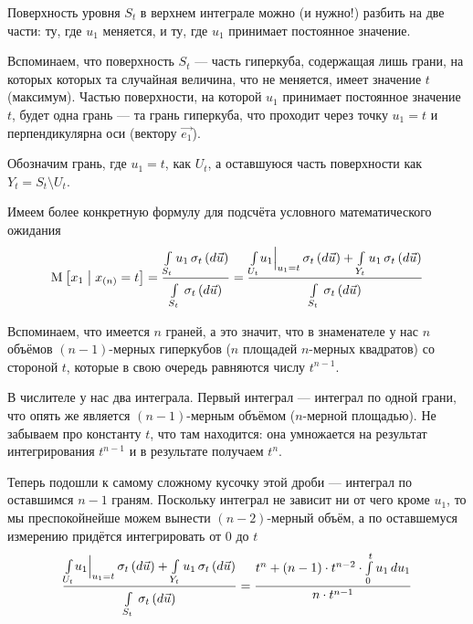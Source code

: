 Поверхность уровня $S_t$ в верхнем интеграле можно (и нужно!)
разбить на две части: ту, где $u_1$ меняется, и ту, где $u_1$
принимает постоянное значение.

Вспоминаем, что поверхность $S_t$ --- часть гиперкуба,
содержащая лишь грани, на которых которых та случайная величина,
что не меняется, имеет значение $t$ (максимум).
Частью поверхности, на которой $u_1$ принимает постоянное значение $t$,
будет одна грань --- та грань гиперкуба, что проходит через точку $u_1 = t$
и перпендикулярна оси (вектору $\vec{e_1}$).

Обозначим грань, где $u_1 = t$, как $U_t$,
а оставшуюся часть поверхности как $Y_t = S_t \setminus U_t$.

Имеем более конкретную формулу для подсчёта условного математического ожидания
\begin{align*}
  \Mean{x_1 \mcond x_{\left( n \right)} = t}
  = \frac{\integrall{S_t}{\sigma_{t}\left(d\vec{u} \right)}{u_1}}{
      \integrall{S_t}{\sigma_{t}\left(d\vec{u} \right)}{}}
  = \frac{\integrall{U_t}{\sigma_{t}\left(d\vec{u} \right)}{
      \Bigl. u_1 \Bigr|_{u_1 = t}}
      + \integrall{Y_t}{\sigma_{t}\left(d\vec{u} \right)}{
      u_1}}{
      \integrall{S_t}{\sigma_{t}\left(d\vec{u} \right)}{}}
\end{align*}

Вспоминаем, что имеется $n$ граней, а это значит, что в знаменателе
у нас $n$ объёмов $\left( n-1 \right)$-мерных гиперкубов
($n$ площадей $n$-мерных квадратов)
со стороной $t$, которые в свою очередь равняются числу $t^{n-1}$.

В числителе у нас два интеграла.
Первый интеграл --- интеграл по одной грани, что опять же является
$\left( n-1 \right)$-мерным объёмом ($n$-мерной площадью).
Не забываем про константу $t$, что там находится: она умножается
на результат интегрирования $t^{n-1}$ и в результате получаем $t^n$.

Теперь подошли к самому сложному кусочку этой дроби ---
интеграл по оставшимся $n-1$ граням.
Поскольку интеграл не зависит ни от чего кроме $u_1$, то мы преспокойнейше
можем вынести $\left( n-2 \right)$-мерный объём, а по оставшемуся измерению
придётся интегрировать от $0$ до $t$
$$\frac{\integrall{U_t}{\sigma_{t}\left(d\vec{u} \right)}{
      \Bigl. u_1 \Bigr|_{u_1 = t}}
      + \integrall{Y_t}{\sigma_{t}\left(d\vec{u} \right)}{
      u_1}}{
      \integrall{S_t}{\sigma_{t}\left(d\vec{u} \right)}{}}
  = \frac{t^n + \left( n-1 \right) \cdot t^{n-2}
      \cdot \integral{0}{t}{u_1}{u_1}}{n \cdot t^{n-1}}$$


